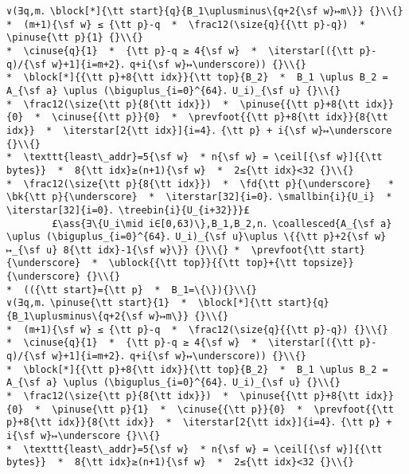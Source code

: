 \documentclass[10pt,a4paper,twoside]{report}
\makeatletter
\newcommand{\ml}[2][t]{\mbox{\mdseries\begin{tabular}[#1]{@{}L@{}}#2\end{tabular}}}
\newcommand{\ass}[1]{\ensuremath{{\color{blue}\left\{\ml[c]{#1}\right\}}}}
\renewcommand{\ceil}[2][]{\left\lceil{#2}\right\rceil_{#1}}
\newcommand{\iterstar}[2][]{\text{\LARGE $*$}^{#1}_{#2}}
\makeatother
\begin{document}
\begin{lstlisting}
∨(∃q,m．\block[*]{\tt start}{q}{B_1\uplusminus\{q+2{\sf w}↦m\}} {}\\{}
*  (m+1){\sf w} ≤ {\tt p}-q  *  \frac12(\size{q}{{\tt p}-q})  *  \pinuse{\tt p}{1} {}\\{}
*  \cinuse{q}{1}  *  {\tt p}-q ≥ 4{\sf w}  *  \iterstar[({\tt p}-q)/{\sf w}+1]{i=m+2}．q+i{\sf w}↦\underscore)) {}\\{}
*  \block[*]{{\tt p}+8{\tt idx}}{\tt top}{B_2}  *  B_1 \uplus B_2 = A_{\sf a} \uplus (\biguplus_{i=0}^{64}．U_i)_{\sf u} {}\\{}
*  \frac12(\size{\tt p}{8{\tt idx}})  *  \pinuse{{\tt p}+8{\tt idx}}{0}  *  \cinuse{{\tt p}}{0}  *  \prevfoot{{\tt p}+8{\tt idx}}{8{\tt idx}}  *  \iterstar[2{\tt idx}]{i=4}．{\tt p} + i{\sf w}↦\underscore {}\\{}
*  \texttt{least\_addr}=5{\sf w}  * n{\sf w} = \ceil[{\sf w}]{{\tt bytes}}  *  8{\tt idx}≥(n+1){\sf w}  *  2≤{\tt idx}<32 {}\\{}
*  \frac12(\size{\tt p}{8{\tt idx}})  *  \fd{\tt p}{\underscore}   *  \bk{\tt p}{\underscore}  *  \iterstar[32]{i=0}．\smallbin{i}{U_i}  *  \iterstar[32]{i=0}．\treebin{i}{U_{i+32}}}£ 
        £\ass{∃\{U_i\mid i∈[0,63)\},B_1,B_2,n．\coallesced{A_{\sf a} \uplus (\biguplus_{i=0}^{64}．U_i)_{\sf u}\uplus \{{\tt p}+2{\sf w}↦_{\sf u} 8{\tt idx}-1{\sf w}\}} {}\\{} *  \prevfoot{\tt start}{\underscore}  *  \ublock{{\tt top}}{{\tt top}+{\tt topsize}}{\underscore} {}\\{}
*  (({\tt start}={\tt p}  *  B_1=\{\}){}\\{}
∨(∃q,m．\pinuse{\tt start}{1}  *  \block[*]{\tt start}{q}{B_1\uplusminus\{q+2{\sf w}↦m\}} {}\\{}
*  (m+1){\sf w} ≤ {\tt p}-q  *  \frac12(\size{q}{{\tt p}-q}) {}\\{}
*  \cinuse{q}{1}  *  {\tt p}-q ≥ 4{\sf w}  *  \iterstar[({\tt p}-q)/{\sf w}+1]{i=m+2}．q+i{\sf w}↦\underscore)) {}\\{}
*  \block[*]{{\tt p}+8{\tt idx}}{\tt top}{B_2}  *  B_1 \uplus B_2 = A_{\sf a} \uplus (\biguplus_{i=0}^{64}．U_i)_{\sf u} {}\\{}
*  \frac12(\size{\tt p}{8{\tt idx}})  *  \pinuse{{\tt p}+8{\tt idx}}{0}  *  \pinuse{\tt p}{1}  *  \cinuse{{\tt p}}{0}  *  \prevfoot{{\tt p}+8{\tt idx}}{8{\tt idx}}  *  \iterstar[2{\tt idx}]{i=4}．{\tt p} + i{\sf w}↦\underscore {}\\{}
*  \texttt{least\_addr}=5{\sf w}  * n{\sf w} = \ceil[{\sf w}]{{\tt bytes}}  *  8{\tt idx}≥(n+1){\sf w}  *  2≤{\tt idx}<32 {}\\{}

\end{lstlisting}
\end{document}
